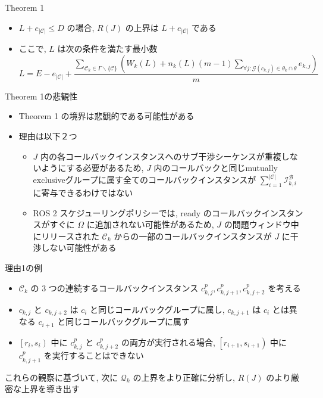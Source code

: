 \begin{frame}{}
\end{frame}

\begin{frame}{Theorem 1}
    \begin{theorem}[]
        \setlength{\linewidth}{0.98\columnwidth}
        \begin{itemize}
            \item $L+e_{|\mathcal{C}|} \leq D$ の場合, $R(J)$ の上界は $L+e_{|\mathcal{C}|}$ である
            \item ここで, $L$ は次の条件を満たす最小数
                  \begin{equation*}
                      L=E-e_{|\mathcal{C}|}+\frac{\sum_{\mathcal{C}_{k} \in \Gamma \backslash\{\mathcal{C}\}}\left(W_{k}(L)+n_{k}(L)(m-1) \sum_{\forall j: \mathcal{G}\left(c_{k, j}\right) \in \theta_{k} \cap \theta} e_{k, j}\right)}{m}
                  \end{equation*}
        \end{itemize}
    \end{theorem}
\end{frame}


\begin{frame}{Theorem 1の悲観性}
    \begin{itemize}
        \item Theorem 1 の境界は悲観的である可能性がある
        \item 理由は以下２つ
        \begin{itemize}
            \item $J$ 内の各コールバックインスタンスへのサブ干渉シーケンスが重複しないようにする必要があるため, $J$ 内のコールバックと同じmutually exclusiveグループに属す全てのコールバックインスタンスが $\sum_{i=1}^{|\mathcal{C}|} \mathcal{I}_{k, i}^{\mathcal{B}}$ に寄与できるわけではない
            \item ROS 2 スケジューリングポリシーでは, ready のコールバックインスタンスがすぐに $\Omega$ に追加されない可能性があるため, $J$ の問題ウィンドウ中にリリースされた $\mathcal{C}_{k}$ からの一部のコールバックインスタンスが $J$ に干渉しない可能性がある
        \end{itemize}
    \end{itemize}
\end{frame}

\begin{frame}{理由1の例}
    \begin{itemize}
        \item $\mathcal{C}_{k}$ の 3 つの連続するコールバックインスタンス $c_{k, j}^{p}, c_{k, j+1}^{p}, c_{k, j+2}^{p}$ を考える
        \item $c_{k, j}$ と $c_{k, j+2}$ は $c_{i}$ と同じコールバックグループに属し, $c_{k, j+1}$ は $c_{i}$ とは異なる $c_{i+1}$ と同じコールバックグループに属す
        \item $\left[r_{i}, s_{i}\right)$ 中に $c_{k, j}^{p}$ と $c_{k, j+2}^{p}$ の両方が実行される場合, $\left[r_{i+1}, s_{i+1}\right)$ 中に $c_{k, j+1}^{p}$ を実行することはできない
    \end{itemize}
\end{frame}

\begin{frame}{}
    これらの観察に基づいて, 次に $\mathcal{Q}_{k}$ の上界をより正確に分析し, $R(J)$ のより厳密な上界を導き出す
\end{frame}
